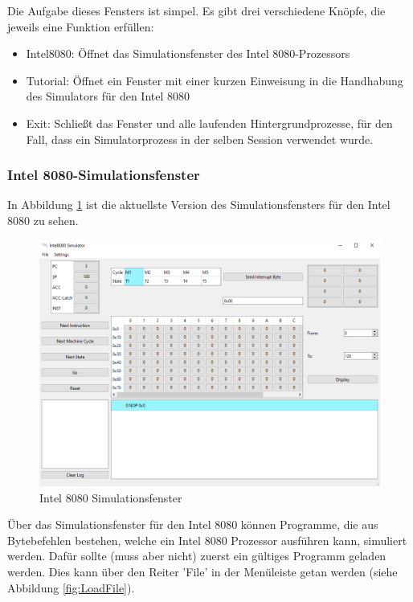 \documentclass[12pt]{article}
\newcommand{\imgSpaceBefore}{\vspace{10pt}}
\begin{document}
\noindent
Die Aufgabe dieses Fensters ist simpel. Es gibt drei verschiedene Knöpfe, die jeweils eine Funktion erfüllen:
\begin{itemize}
	\item Intel8080: Öffnet das Simulationsfenster des Intel 8080-Prozessors
	\item Tutorial: Öffnet ein Fenster mit einer kurzen Einweisung in die Handhabung des Simulators für den Intel 8080
	\item Exit: Schließt das Fenster und alle laufenden Hintergrundprozesse, für den Fall, dass ein Simulatorprozess in der selben Session verwendet wurde.
\end{itemize}

\subsubsection{Intel 8080-Simulationsfenster}
In Abbildung \ref{fig:I8080MW} ist die aktuellste Version des Simulationsfensters für den Intel 8080 zu sehen.\imgSpaceBefore

\begin{figure}[H]
\centering
\includegraphics[width=15cm]{bilder/Intel8080_MainWindow}
\caption{Intel 8080 Simulationsfenster}
\label{fig:I8080MW}
\end{figure}

\noindent
Über das Simulationsfenster für den Intel 8080 können Programme, die aus Bytebefehlen bestehen, welche ein Intel 8080 Prozessor ausführen kann, simuliert werden. Dafür sollte (muss aber nicht) zuerst ein gültiges Programm geladen werden. Dies kann über den Reiter 'File' in der Menüleiste getan werden (siehe Abbildung \ref{fig:LoadFile}).\imgSpaceBefore
\end{document}
